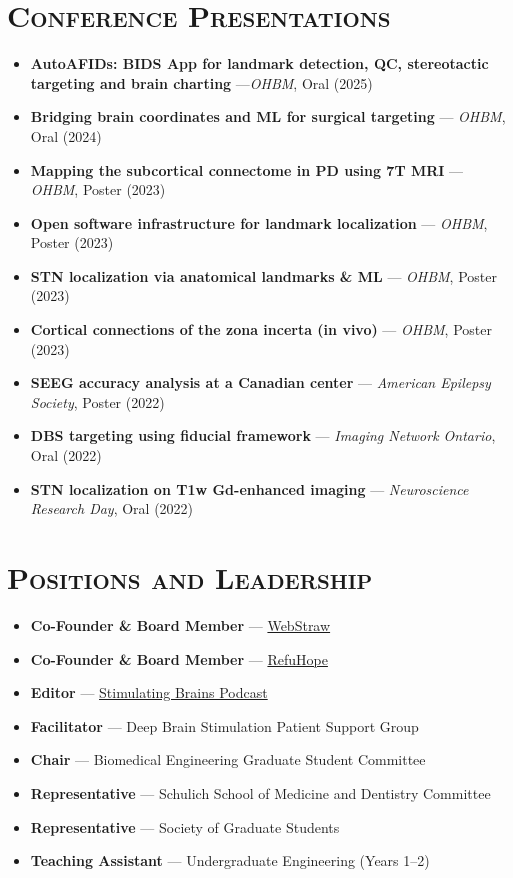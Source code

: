 \section*{\textsc{Conference Presentations}} \noindent\hrulefill \vspace{0.5em}
\begin{itemize}
  \item \textbf{AutoAFIDs: BIDS App for landmark detection, QC, stereotactic targeting and brain charting} —\textit{OHBM}, Oral (2025)
  \item \textbf{Bridging brain coordinates and ML for surgical targeting} — \textit{OHBM}, Oral (2024)
  \item \textbf{Mapping the subcortical connectome in PD using 7T MRI} — \textit{OHBM}, Poster (2023)
  \item \textbf{Open software infrastructure for landmark localization} — \textit{OHBM}, Poster (2023)
  \item \textbf{STN localization via anatomical landmarks \& ML} — \textit{OHBM}, Poster (2023)
  \item \textbf{Cortical connections of the zona incerta (in vivo)} — \textit{OHBM}, Poster (2023)
  \item \textbf{SEEG accuracy analysis at a Canadian center} — \textit{American Epilepsy Society}, Poster (2022)
  \item \textbf{DBS targeting using fiducial framework} — \textit{Imaging Network Ontario}, Oral (2022)
  \item \textbf{STN localization on T1w Gd-enhanced imaging} — \textit{Neuroscience Research Day}, Oral (2022)
\end{itemize}

\vspace{1.5em}
\section*{\textsc{Positions and Leadership}} \noindent\hrulefill \vspace{0.5em}
\begin{itemize}
  \item \textbf{Co-Founder \& Board Member} — \href{https://webstraw.ca}{WebStraw}
  \item \textbf{Co-Founder \& Board Member} — \href{https://refuhope.com}{RefuHope}
  \item \textbf{Editor} — \href{https://stimulatingbrains.org}{Stimulating Brains Podcast}
  \item \textbf{Facilitator} — Deep Brain Stimulation Patient Support Group
  \item \textbf{Chair} — Biomedical Engineering Graduate Student Committee
  \item \textbf{Representative} — Schulich School of Medicine and Dentistry Committee
  \item \textbf{Representative} — Society of Graduate Students
  \item \textbf{Teaching Assistant} — Undergraduate Engineering (Years 1–2)
\end{itemize}

